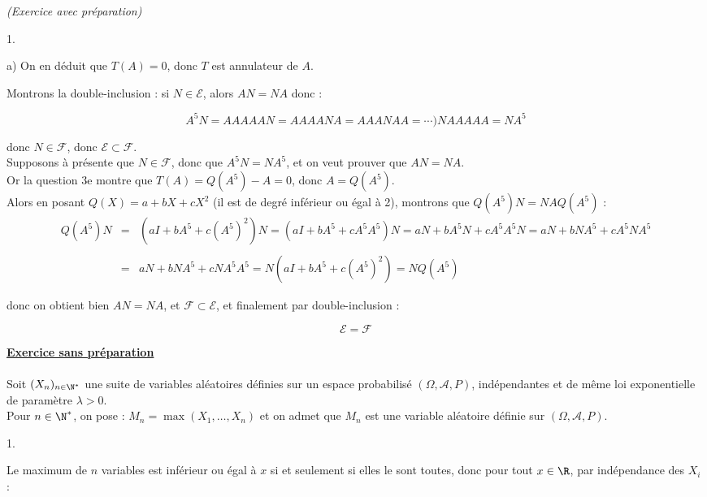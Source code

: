 \documentclass[11pt]{article}%
\begin{document}
\begin{exercice}{\it (Exercice avec préparation)}
\begin{noliste}{1.}
\begin{noliste}{a)}
 On en déduit que $T ( A ) = 0$, donc $T$ est annulateur de $A$. \\

 \end{noliste}

 \item Montrons la double-inclusion : si $N \in \mathcal{E}$, alors $A
N = N A$ donc : 
 
\[
 A^{5} N = A A A A A N = A A A A N A = A A A N A A = \cdots ) N A A A A
A = N A^{5} 
\]

 donc $N \in \mathcal{F}$, donc $\mathcal{E} \subset \mathcal{F}$. \\

 Supposons à présente que $N \in \mathcal{F}$, donc que $ A^{5} N = N
A^{5} $, et on veut prouver que $A N = N A$. \\

 Or la question 3e montre que $T (A) = Q ( A^{5} ) - A = 0$, donc $A =
Q ( A^{5})$. \\

 Alors en posant $Q (X) = a + b X + c X^{2}$ (il est de degré inférieur
ou égal à 2), montrons que $Q ( A^{5} ) N = N A Q (A^{5} )$ : 
 \begin{eqnarray*}
 Q ( A^{5} ) N & = & ( a I + b A^{5} + c ( A^{5})^{2} ) N = ( a I + b
A^{5} + c A^{5} A^{5} ) N = a N + b A^{5} N + c A^{5} A^{5} N = a N + b
N A^{5} + c A^{5} N A^{5} \\
\\
 & = & a N + b N A^{5} + c N A^{5} A^{5} = N ( a I + b A^{5} + c
(A^{5})^{2} ) = N Q ( A^{5} ) 
 \end{eqnarray*}

 donc on obtient bien $A N = N A$, et $\mathcal{F} \subset
\mathcal{E}$, et finalement par double-inclusion : 
 
\[
 \mathcal{E} = \mathcal{F} 
\]

 \end{noliste}

 \noindent \textbf{\underline{Exercice sans préparation}} \\
\\
 Soit $(X_{n})_{ n \in \N^* }$ une suite de variables aléatoires
définies sur un espace probabilisé $(\Omega, \mathcal{A}, P)$,
indépendantes et de même loi exponentielle de paramètre $\lambda > 0$.
\\
 Pour $n \in \N^*$, on pose : $M_{n} = \max ( X_{1}, \dots, X_{n})$ et
on admet que $M_{n}$ est une variable aléatoire définie sur $(\Omega,
\mathcal{A}, P)$.
 \begin{noliste}{1.}
 \setlength{\itemsep}{4mm}
 \item Le maximum de $n$ variables est inférieur ou égal à $x$ si et
seulement si elles le sont toutes, donc pour tout $x \in \R$, par
indépendance des $X_{i}$ :
 

\end{noliste}
\end{exercice}
\end{document}
